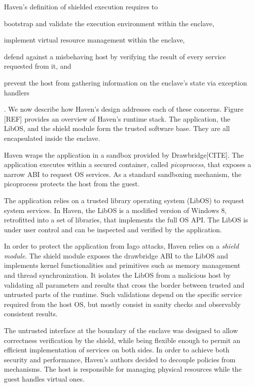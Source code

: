 Haven's definition of shielded execution requires to
\begin{enumerate*}
	\item bootstrap and validate the execution environment within the enclave,
	\item implement virtual resource management within the enclave,
	\item defend against a misbehaving host by verifying the result of every service requested from it, and
	\item prevent the host from gathering information on the enclave's state via exception handlers
\end{enumerate*}.
We now describe how Haven's design addresses each of these concerns.
Figure [REF] provides an overview of Haven's runtime stack.
The application, the LibOS, and the shield module form the trusted software base.
They are all encapsulated inside the enclave.

Haven wraps the application in a sandbox provided by Drawbridge[CITE].
The application executes within a secured container, called \emph{picoprocess}, that exposes a narrow ABI to request OS services.
As a standard sandboxing mechanism, the picoprocess protects the host from the guest.

The application relies on a trusted library operating system (LibOS) to request system services.
In Haven, the LibOS is a modified version of Windows 8, retrofitted into a set of libraries, that implements the full OS API.
The LibOS is under user control and can be inspected and verified by the application.

In order to protect the application from Iago attacks, Haven relies on a \emph{shield module}.
The shield module exposes the drawbridge ABI to the LibOS and implements kernel functionalities and primitives such as memory management and thread synchronization.
It isolates the LibOS from a malicious host by validating all parameters and results that cross the border between trusted and untrusted parts of the runtime.
Such validations depend on the specific service required from the host OS, but mostly consist in sanity checks and observably consistent results.

The untrusted interface at the boundary of the enclave was designed to allow correctness verification by the shield, while being flexible enough to permit an efficient implementation of services on both sides.
In order to achieve both security and performance, Haven's authors decided to decouple policies from mechanisms.
The host is responsible for managing physical resources while the guest handles virtual ones.


